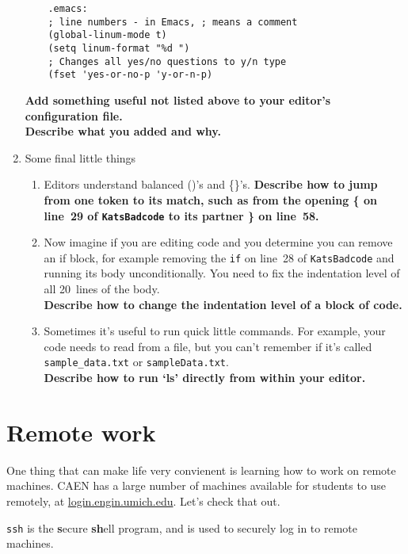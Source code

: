 \documentclass{article}
\begin{document}
\begin{enumerate}
\begin{lstlisting}
    .emacs:
    ; line numbers - in Emacs, ; means a comment
    (global-linum-mode t)
    (setq linum-format "%d ")
    ; Changes all yes/no questions to y/n type
    (fset 'yes-or-no-p 'y-or-n-p)
    \end{lstlisting}
    \textbf{Add something useful not listed above to your editor's configuration file.\\
      Describe  what you added and why.}
    \vspace{12em}
  \item Some final little things
    \small
    \begin{enumerate}
      \item Editors understand balanced ()'s and \{\}'s.
        \textbf{Describe how to jump from one token to its match, such as from
          the opening \{ on line~29 of \texttt{KatsBadcode} to its partner \}
          on line~58.
        }
        \vspace{4em}
      \item Now imagine if you are editing code and you determine you can
        remove an if block, for example removing the \texttt{if} on line~28 of
        \texttt{KatsBadcode} and running its body unconditionally. You need to
        fix the indentation level of all 20~lines of the body.\\
        \textbf{Describe how to change the indentation level of a block of code.}
        \vspace{4em}
      \item Sometimes it's useful to run quick little commands. For example,
        your code needs to read from a file, but you can't remember if it's
        called \texttt{sample\_data.txt} or \texttt{sampleData.txt}.\\
        \textbf{Describe how to run `ls' directly from within your editor.}
        \vspace{4em}
    \end{enumerate}
\end{enumerate}


\newpage
\section{Remote work}
One thing that can make life very convienent is learning how to work on remote
machines. CAEN has a large number of machines available for students to use
remotely, at \url{login.engin.umich.edu}. Let's check that out.

\texttt{ssh} is the \textbf{s}ecure \textbf{sh}ell program, and is used to
securely log in to remote machines.
\end{document}
